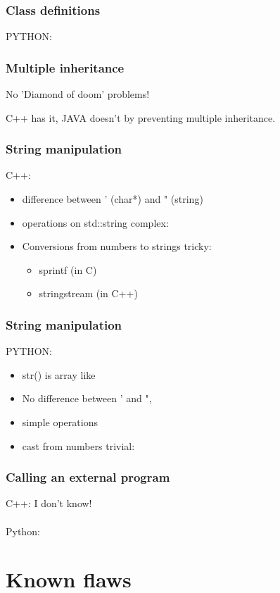 \documentclass[14pt]{beamer}
\begin{document}
\begin{frame}
\frametitle{Class definitions}
PYTHON:

\end{frame}


\begin{frame}
\frametitle{Multiple inheritance}


No 'Diamond of doom' problems!

C++ has it, JAVA doesn't by preventing multiple inheritance.
\end{frame}


\begin{frame}
\frametitle{String manipulation}
C++: 
\begin{itemize}
\item difference between ' (char*) and " (string)
\item operations on std::string complex:

\item Conversions from numbers to strings tricky:
\begin{itemize}
\item sprintf (in C)
\item stringstream (in C++)
\end{itemize}
\end{itemize}
\end{frame}

\begin{frame}
\frametitle{String manipulation}
PYTHON:
\begin{itemize}
\item str() is array like
\item No difference between ' and ",

\item simple operations

\item cast from numbers trivial:

\end{itemize}
\end{frame}

\begin{frame}
\frametitle{Calling an external program}
C++: I don't know!\\
~\\
Python:

\end{frame}

\section{Known flaws}
\end{document}
